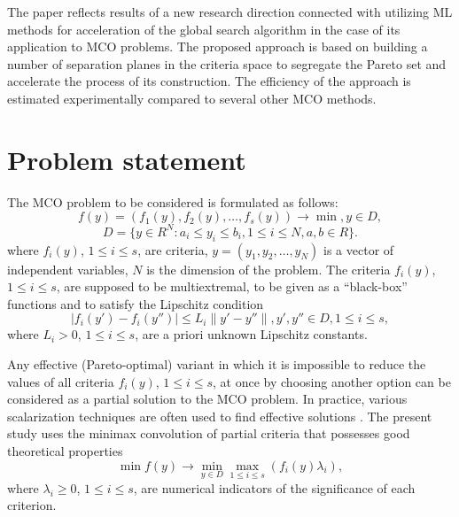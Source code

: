 \documentclass[runningheads]{llncs}
\begin{document}
The paper reflects results of a new research direction connected with utilizing ML methods for acceleration of the global search algorithm in the case of its application to MCO problems. The proposed approach is based on building a number of separation planes in the criteria space to segregate the Pareto set and accelerate the process of its construction. The efficiency of the approach is estimated experimentally compared to several other MCO methods.


\section{Problem statement}

The MCO problem to be considered is formulated as follows:
\begin{equation}
f(y)=(f_1 (y),f_2 (y),\dots ,f_s (y)) \to \min, y\in D,
\label{eq:1}
\end{equation}
\begin{equation}
D=\{ y \in R^N: a_i \leq y_i \leq b_i,1 \leq i \leq N,a,b \in R \}.
\label{eq:2}
\end{equation}
where $f_i (y)$, $1 \leq i \leq s$, are  criteria, $y=(y_1,y_2, \dots,y_N)$ is a vector of independent variables, $N$ is the dimension of the problem. The criteria $f_i (y)$, $1 \leq i \leq s$, are supposed to be multiextremal, to be given as a ``black-box'' functions and to satisfy the Lipschitz condition
\begin{equation}
|f_i (y')-f_i (y'')| \leq L_i \|y'-y''\|,y',y'' \in D, 1 \leq i \leq s,
\label{eq:3}
\end{equation}
where $L_i>0$, $1 \leq i \leq s$, are a priori unknown Lipschitz constants.

Any effective (Pareto-optimal) variant  in which it is impossible to reduce the values of all criteria $f_i (y)$, $1 \leq i \leq s$, at once by choosing another option   can be considered as a partial solution to the MCO problem. In practice, various scalarization techniques are often used to find effective solutions \cite{Ehrgott2005,Pardalos2017,Marler2004,GergelKozinov2020}. The present study uses the minimax convolution of partial criteria that possesses good theoretical properties
\begin{equation}
\min{f(y)} \to \min_{y\in D}{\max_{1 \leq i \leq s}{(f_i (y) \lambda_i )}} ,
\label{eq:4}
\end{equation}
where $\lambda_i \geq 0$, $1 \leq i \leq s$, are numerical indicators of the significance of each criterion. 
\end{document}
